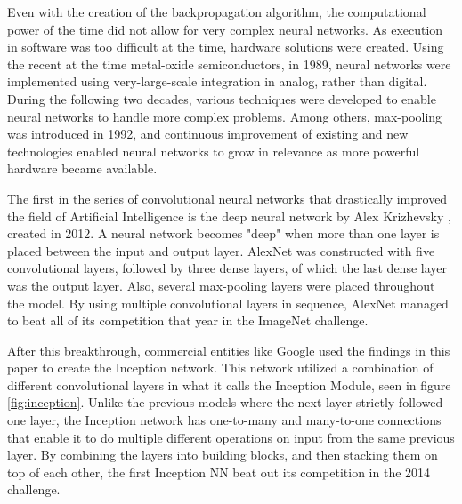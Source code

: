 
Even with the creation of the backpropagation algorithm, the computational power of the time did not allow for very complex neural networks. 
As execution in software was too difficult at the time, hardware solutions were created. Using the recent at the time metal-oxide semiconductors, in 1989, neural networks were implemented using very-large-scale integration in analog, rather than digital\cite{mead2012analog}. 
During the following two decades, various techniques were developed to enable neural networks to handle more complex problems.
Among others, max-pooling was introduced in 1992\cite{cresceptron1992}, and continuous improvement of existing and new technologies enabled neural networks to grow in relevance as more powerful hardware became available.


The first in the series of convolutional neural networks that drastically improved the field of Artificial Intelligence is the deep neural network by Alex Krizhevsky \cite{Krizhevsky:2017:ICD:3098997.3065386}, created in 2012. 
A neural network becomes "deep" when more than one layer is placed between the input and output layer.
AlexNet was constructed with five convolutional layers, followed by three dense layers, of which the last dense layer was the output layer.
Also, several max-pooling layers were placed throughout the model.
By using multiple convolutional layers in sequence, AlexNet managed to beat all of its competition that year in the ImageNet\cite{ImageNetMain} challenge\cite{ImageNet2012}.



After this breakthrough, commercial entities like Google used the findings in this paper to create the Inception\cite{szegedy2014going} network. 
This network utilized a combination of different convolutional layers in what it calls the Inception Module, seen in figure \cref{fig:inception}.
Unlike the previous models where the next layer strictly followed one layer, the Inception network has one-to-many and many-to-one connections that enable it to do multiple different operations on input from the same previous layer.
By combining the layers into building blocks, and then stacking them on top of each other, the first Inception NN beat out its competition in the 2014 challenge\cite{ImageNet2014}. %
%


